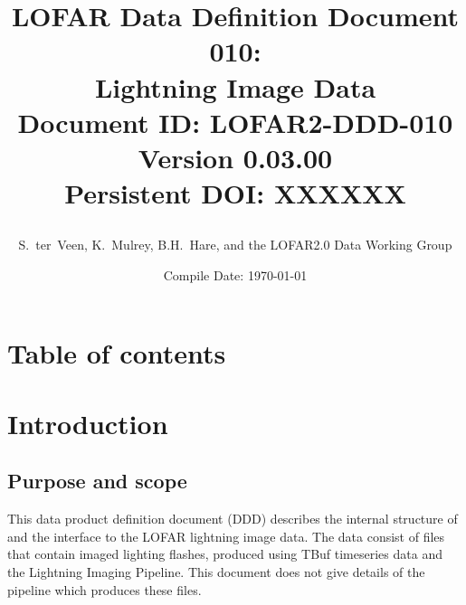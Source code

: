 \documentclass[a4paper,10pt,bibtotoc]{scrartcl}
\begin{document}
\title{LOFAR Data Definition Document 010:\\ Lightning Image Data\\
  {\normalsize Document ID: LOFAR2-DDD-010} \\
  {\normalsize Version 0.03.00} \\
   {\normalsize Persistent DOI: XXXXXX} \\
\author{ \parbox{\linewidth}{\centering S.~ter~Veen,  K.~Mulrey, B.H.~Hare, and the LOFAR2.0 Data Working Group} }
\date{\small{Compile Date: \today}} 
}

\maketitle

\section{Table of contents}
\tableofcontents

\listoffigures

\listoftables

\clearpage










\clearpage


\section{Introduction}
\label{sec:introduction}


\subsection{Purpose and scope}
\label{sec:purpose and scope}

This data product definition document (DDD) describes the internal structure
of and the interface to the LOFAR lightning image data. The data consist of files that contain imaged lighting flashes, produced using TBuf timeseries data and the Lightning Imaging Pipeline. This document does not give details of the pipeline which produces these files.
\end{document}
